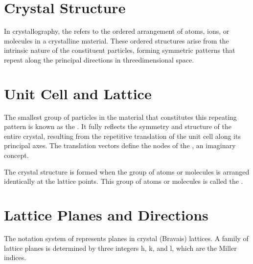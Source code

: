 \documentclass[letterpaper,10pt,english]{sphinxmanual}
\let\sphinxpxdimen\pdfpxdimen\else\newdimen\sphinxpxdimen
\begin{document}
\section{Crystal Structure}
\label{\detokenize{crystal/crystal:crystal-structure}}
\sphinxAtStartPar
In crystallography, the  refers to the ordered arrangement of atoms, ions, or molecules in a crystalline material. These ordered structures arise from the intrinsic nature of the constituent particles, forming symmetric patterns that repeat along the principal directions in three\sphinxhyphen{}dimensional space.


\section{Unit Cell and Lattice}
\label{\detokenize{crystal/crystal:unit-cell-and-lattice}}
\sphinxAtStartPar
The smallest group of particles in the material that constitutes this repeating pattern is known as the . It fully reflects the symmetry and structure of the entire crystal, resulting from the repetitive translation of the unit cell along its principal axes. The translation vectors define the nodes of the , an imaginary concept.

\begin{figure}[htbp]
\centering

\noindent\sphinxincludegraphics[width=220\sphinxpxdimen]{{Basis}.jpg}
\end{figure}

\sphinxAtStartPar
The crystal structure is formed when the group of atoms or molecules is arranged identically at the lattice points. This group of atoms or molecules is called the .


\section{Lattice Planes and Directions}
\label{\detokenize{crystal/crystal:lattice-planes-and-directions}}
\sphinxAtStartPar
The notation system of  represents planes in crystal (Bravais) lattices. A family of lattice planes is determined by three integers h, k, and l, which are the Miller indices.

\begin{figure}[htbp]
\centering

\noindent{}
\end{figure}
\end{document}
